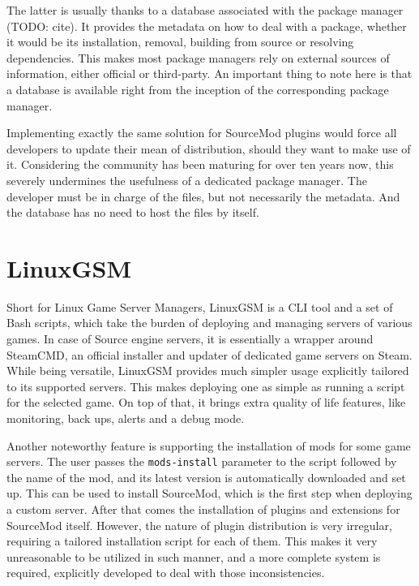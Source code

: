 The latter is usually thanks to a database associated with the package manager (TODO: cite).
It provides the metadata on how to deal with a package, whether it would be its installation, removal, building from source or resolving dependencies.
This makes most package managers rely on external sources of information, either official or third-party.
An important thing to note here is that a database is available right from the inception of the corresponding package manager.

Implementing exactly the same solution for SourceMod plugins would force all developers to update their mean of distribution, should they want to make use of it.
Considering the community has been maturing for over ten years now, this severely undermines the usefulness of a dedicated package manager.
The developer must be in charge of the files, but not necessarily the metadata.
And the database has no need to host the files by itself.

\section{LinuxGSM}

Short for Linux Game Server Managers, LinuxGSM is a CLI tool and a set of Bash scripts, which take the burden of deploying and managing servers of various games.
In case of Source engine servers, it is essentially a wrapper around SteamCMD, an official installer and updater of dedicated game servers on Steam.
While being versatile, LinuxGSM provides much simpler usage explicitly tailored to its supported servers.
This makes deploying one as simple as running a script for the selected game.
On top of that, it brings extra quality of life features, like monitoring, back ups, alerts and a debug mode.

Another noteworthy feature is supporting the installation of mods for some game servers.
The user passes the \verb|mods-install| parameter to the script followed by the name of the mod, and its latest version is automatically downloaded and set up.
This can be used to install SourceMod, which is the first step when deploying a custom server.
After that comes the installation of plugins and extensions for SourceMod itself.
However, the nature of plugin distribution is very irregular, requiring a tailored installation script for each of them.
This makes it very unreasonable to be utilized in such manner, and a more complete system is required, explicitly developed to deal with those inconsistencies.

